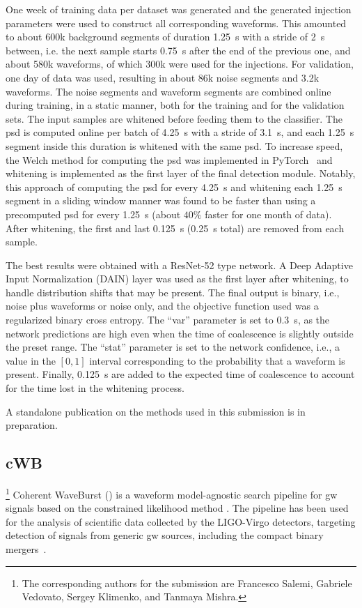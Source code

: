 One week of training data per dataset was generated and the generated injection parameters were used to construct all corresponding waveforms. This amounted to about 600k background segments of duration \SI{1.25}{\second} with a stride of \SI{2}{\second} between, i.e. the next sample starts \SI{0.75}{\second} after the end of the previous one, and about 580k waveforms, of which 300k were used for the injections. For validation, one day of data was used, resulting in about 86k noise segments and 3.2k waveforms. The noise segments and waveform segments are combined online during training, in a static manner, both for the training and for the validation sets. The input samples are whitened before feeding them to the classifier. The \acrshort{psd} is computed online per batch of \SI{4.25}{\second} with a stride of \SI{3.1}{\second}, and each \SI{1.25}{\second} segment inside this duration is whitened with the same \acrshort{psd}. To increase speed, the Welch method for computing the \acrshort{psd} was implemented in PyTorch~\cite{Paszke:2019aaa} and whitening is implemented as the first layer of the final detection module. Notably, this approach of computing the \acrshort{psd} for every \SI{4.25}{\second} and whitening each \SI{1.25}{\second} segment in a sliding window manner was found to be faster than using a precomputed \acrshort{psd} for every \SI{1.25}{\second} (about $40\%$ faster for one month of data). After whitening, the first and last \SI{0.125}{\second} (\SI{0.25}{\second} total) are removed from each sample.

The best results were obtained with a ResNet-52 type network. A Deep Adaptive Input Normalization (DAIN) layer \cite{passalis2019deep} was used as the first layer after whitening, to handle distribution shifts that may be present. The final output is binary, i.e., noise plus waveforms or noise only, and the objective function used was a regularized binary cross entropy. The ``var'' parameter is set to \SI{0.3}{\second}, as the network predictions are high even when the time of coalescence is slightly outside the preset range. The ``stat'' parameter is set to the network confidence, i.e., a value in the $[0, 1]$ interval corresponding to the probability that a waveform is present. Finally, \SI{0.125}{\second} are added to the expected time of coalescence to account for the time lost in the whitening process.

A standalone publication on the methods used in this submission is in preparation.

\subsection{cWB}\label{sec:submission-cwb}
\footnote{The corresponding authors for the \cwb submission are Francesco Salemi, Gabriele Vedovato, Sergey Klimenko, and Tanmaya Mishra.}
Coherent WaveBurst (\cwb) is a waveform model-agnostic search pipeline for \acrshort{gw} signals based on the constrained likelihood method \cite{SoftX, zenodo, cWBhomepage}. The \cwb pipeline has been used for the analysis of scientific data collected by the LIGO-Virgo detectors,  targeting detection of signals from generic \acrshort{gw} sources, including the compact binary mergers~\cite{LIGOScientific:2021djp}.

